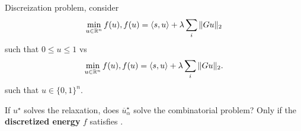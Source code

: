 \begin{remark}
  Discreization problem, consider
  \begin{align}
    \label{eq:124}
    \min_{u \in \R^{n}} f(u), f(u) = \IP{s, u} + \lambda \sum_{i} \| G
    u \|_{2} 
  \end{align} such that $0 \leq u \leq 1$ vs
  \begin{align}
    \label{eq:125}
    \min_{u \in \R^{n}} f(u), f(u) = \IP{s, u} + \lambda \sum_{i} \| G
    u \|_{2}.
  \end{align} such that $u \in \{ 0, 1 \}^{n}$.

  If $u^{\star}$ solves the relaxation, does $\overline
  u^{\star}_{\alpha}$ solve the combinatorial problem?  Only if the
  \textbf{discretized energy} $f$ satisfies \gcc.
\end{remark}

